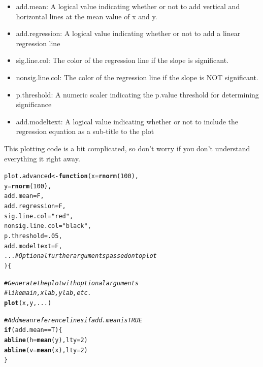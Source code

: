 \documentclass{tufte-book}\usepackage[]{graphicx}\usepackage[]{color}
\makeatletter
\newcommand{\hlnum}[1]{\textcolor[rgb]{0.686,0.059,0.569}{#1}}%
\newcommand{\hlstr}[1]{\textcolor[rgb]{0.192,0.494,0.8}{#1}}%
\newcommand{\hlcom}[1]{\textcolor[rgb]{0.678,0.584,0.686}{\textit{#1}}}%
\newcommand{\hlopt}[1]{\textcolor[rgb]{0,0,0}{#1}}%
\newcommand{\hlstd}[1]{\textcolor[rgb]{0.345,0.345,0.345}{#1}}%
\newcommand{\hlkwa}[1]{\textcolor[rgb]{0.161,0.373,0.58}{\textbf{#1}}}%
\newcommand{\hlkwb}[1]{\textcolor[rgb]{0.69,0.353,0.396}{#1}}%
\newcommand{\hlkwc}[1]{\textcolor[rgb]{0.333,0.667,0.333}{#1}}%
\newcommand{\hlkwd}[1]{\textcolor[rgb]{0.737,0.353,0.396}{\textbf{#1}}}%
\newenvironment{kframe}{%
 \def\at@end@of@kframe{}%
 \ifinner\ifhmode%
  \def\at@end@of@kframe{\end{minipage}}%
  \begin{minipage}{\columnwidth}%
 \fi\fi%
 \def\FrameCommand##1{\hskip\@totalleftmargin \hskip-\fboxsep
 \colorbox{shadecolor}{##1}\hskip-\fboxsep
     \hskip-\linewidth \hskip-\@totalleftmargin \hskip\columnwidth}%
 \MakeFramed {\advance\hsize-\width
   \@totalleftmargin\z@ \linewidth\hsize
   \@setminipage}}%
 {\par\unskip\endMakeFramed%
 \at@end@of@kframe}
\newenvironment{knitrout}{}{} %
\makeatother
\begin{document}
\begin{footnotesize}
\begin{itemize}

  \item add.mean: A logical value indicating whether or not to add vertical and horizontal lines at the mean value of x and y.
  \item add.regression: A logical value indicating whether or not to add a linear regression line
  \item sig.line.col: The color of the regression line if the slope is significant.
  \item nonsig.line.col: The color of the regression line if the slope is NOT significant.
  \item p.threshold: A numeric scaler indicating the p.value threshold for determining significance
  \item add.modeltext: A logical value indicating whether or not to include the regression equation as a sub-title to the plot

\end{itemize}

This plotting code is a bit complicated, so don't worry if you don't understand everything it right away.

\begin{knitrout}
\color{fgcolor}\begin{kframe}
\begin{alltt}
\hlstd{plot.advanced} \hlkwb{<-} \hlkwa{function} \hlstd{(}\hlkwc{x} \hlstd{=} \hlkwd{rnorm}\hlstd{(}\hlnum{100}\hlstd{),}
                           \hlkwc{y} \hlstd{=} \hlkwd{rnorm}\hlstd{(}\hlnum{100}\hlstd{),}
                           \hlkwc{add.mean} \hlstd{= F,}
                           \hlkwc{add.regression} \hlstd{= F,}
                           \hlkwc{sig.line.col} \hlstd{=} \hlstr{"red"}\hlstd{,}
                           \hlkwc{nonsig.line.col} \hlstd{=} \hlstr{"black"}\hlstd{,}
                           \hlkwc{p.threshold} \hlstd{=} \hlnum{.05}\hlstd{,}
                           \hlkwc{add.modeltext} \hlstd{= F,}
                           \hlkwc{...}  \hlcom{# Optional further arguments passed on to plot}
                           \hlstd{) \{}

\hlcom{# Generate the plot with optional arguments}
\hlcom{#   like main, xlab, ylab, etc.}
  \hlkwd{plot}\hlstd{(x, y, ...)}

\hlcom{# Add mean reference lines if add.mean is TRUE}
  \hlkwa{if}\hlstd{(add.mean} \hlopt{==} \hlstd{T) \{}
    \hlkwd{abline}\hlstd{(}\hlkwc{h} \hlstd{=} \hlkwd{mean}\hlstd{(y),} \hlkwc{lty} \hlstd{=} \hlnum{2}\hlstd{)}
    \hlkwd{abline}\hlstd{(}\hlkwc{v} \hlstd{=} \hlkwd{mean}\hlstd{(x),} \hlkwc{lty} \hlstd{=} \hlnum{2}\hlstd{)}
  \hlstd{\}}


\end{alltt}
\end{kframe}
\end{knitrout}
\end{footnotesize}
\end{document}
